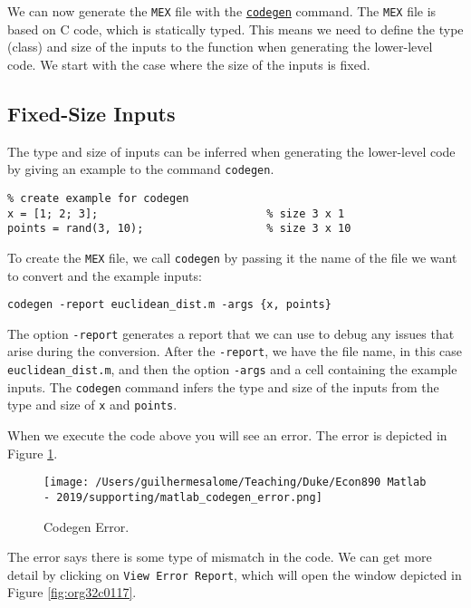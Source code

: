 \documentclass[12pt, a4paper]{article}
\begin{document}
We can now generate the \texttt{MEX} file with the \href{https://www.mathworks.com/help/coder/ref/codegen.html}{\texttt{codegen}} command.
The \texttt{MEX} file is based on C code, which is statically typed.
This means we need to define the type (class) and size of the inputs to the function when generating the lower-level code.
We start with the case where the size of the inputs is fixed.

\subsection{Fixed-Size Inputs}
\label{sec:org048ea1c}
The type and size of inputs can be inferred when generating the lower-level code by giving an example to the command \texttt{codegen}.
\lstset{language=matlab,label= ,caption= ,captionpos=b,firstnumber=1,numbers=left,style=Matlab-editor}
\begin{lstlisting}
% create example for codegen
x = [1; 2; 3];                          % size 3 x 1
points = rand(3, 10);                   % size 3 x 10
\end{lstlisting}
To create the \texttt{MEX} file, we call \texttt{codegen} by passing it the name of the file we want to convert and the example inputs:
\lstset{language=matlab,label= ,caption= ,captionpos=b,firstnumber=1,numbers=left,style=Matlab-editor}
\begin{lstlisting}
codegen -report euclidean_dist.m -args {x, points}
\end{lstlisting}
The option \texttt{-report} generates a report that we can use to debug any issues that arise during the conversion.
After the \texttt{-report}, we have the file name, in this case \texttt{euclidean\_dist.m}, and then the option \texttt{-args} and a cell containing the example inputs.
The \texttt{codegen} command infers the type and size of the inputs from the type and size of \texttt{x} and \texttt{points}.

When we execute the code above you will see an error.
The error is depicted in Figure \ref{fig:org28ba2e1}.

\begin{figure}[H]
\centering
\texttt{[image: /Users/guilhermesalome/Teaching/Duke/Econ890 Matlab - 2019/supporting/matlab\_codegen\_error.png]}
\caption{\label{fig:org28ba2e1}
Codegen Error.}
\end{figure}

The error says there is some type of mismatch in the code.
We can get more detail by clicking on \texttt{View Error Report}, which will open the window depicted in Figure \ref{fig:org32c0117}.
\end{document}
